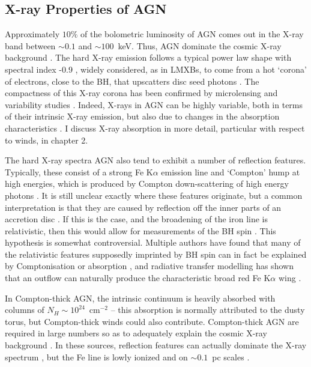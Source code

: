 \subsection{X-ray Properties of AGN}

Approximately $10\%$ of the bolometric luminosity of AGN
comes out in the X-ray band between $\sim0.1$ and $\sim100$~keV.
Thus, AGN dominate the cosmic X-ray background \citep{madau1994}.
The hard X-ray emission follows a typical power law shape with spectral
index -0.9 \citep[e.g.][]{koratkar1999}, 
widely considered, as in LMXBs, to come from a hot `corona' of 
electrons, close to the BH, that upscatters disc seed photons
\citep[e.g.][]{haardt1991}. The compactness of this X-ray corona
has been confirmed by microlensing \citep{chartas2009} 
and variability studies \citep{green1993,crenshaw1996,risaliti2007}. 
Indeed, X-rays in AGN can be highly variable, both in terms of their intrinsic 
X-ray emission, but also due to changes in the absorption characteristics 
\citep{risaliti2002,miller2008,connolly2014}.
I discuss X-ray absorption in more detail, particular with respect to winds, 
in chapter 2.

The hard X-ray spectra AGN also tend to exhibit a number of reflection features. 
Typically, these consist of a strong Fe K$\alpha$ emission line and `Compton' hump
at high energies, which is produced by Compton down-scattering 
of high energy photons \citep{pounds1989,nandra1994}.
It is still unclear exactly where these features originate, 
but a common interpretation is that they are caused by reflection off the inner parts of an accretion disc 
\citep{fabian1995,iwasawa1996b,reynolds1999}.
If this is the case, and the broadening of the iron line is relativistic, then
this would allow for measurements of the BH spin \citep{laor1991,iwasawa1996a,dabrowski1997}.
This hypothesis is somewhat controversial. Multiple authors have found that 
many of the relativistic features supposedly imprinted by BH spin can in fact be explained
by Comptonisation or absorption \citep[e.g.][]{misra1998,miller2013}, 
and radiative transfer modelling has shown that
an outflow can naturally produce the characteristic broad red Fe K$\alpha$ wing \citep{sim2010}.

In Compton-thick AGN, the intrinsic continuum is heavily absorbed with columns of
$N_H\sim10^{24}$~cm$^{-2}$ -- this absorption is normally attributed to the dusty torus, 
but Compton-thick winds could also contribute. Compton-thick AGN are required 
in large numbers so as to adequately explain the cosmic X-ray background \citep{setti1989}.
In these sources, reflection features can actually dominate the X-ray spectrum 
\citep{alexander2011,gandhi2013}, but the Fe line is lowly ionized and 
on $\sim0.1$~pc scales \citep{gandhi2015}.


